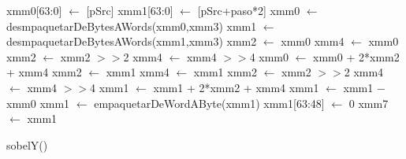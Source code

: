 \documentclass[11pt, a4paper]{article}
\begin{document}
   \begin{algorithm}[H]
     \SetLine
    	xmm0[63:0] $\leftarrow$ [pSrc]\;
			xmm1[63:0] $\leftarrow$ [pSrc+paso*2]\;
			xmm0 $\leftarrow$ desmpaquetarDeBytesAWords(xmm0,xmm3)\;
			xmm1 $\leftarrow$ desmpaquetarDeBytesAWords(xmm1,xmm3)\;
			xmm2 $\leftarrow$ xmm0\;
			xmm4 $\leftarrow$ xmm0\;
			xmm2 $\leftarrow$ xmm2 $>>$2\;
			xmm4 $\leftarrow$ xmm4 $>>$4\;
			xmm0 $\leftarrow$ xmm0 + 2*xmm2 + xmm4\;
			xmm2 $\leftarrow$ xmm1\;
			xmm4 $\leftarrow$ xmm1\;
			xmm2 $\leftarrow$ xmm2 $>>$2\;
			xmm4 $\leftarrow$ xmm4 $>>$4\;
			xmm1 $\leftarrow$ xmm1 + 2*xmm2 + xmm4\;
			xmm1 $\leftarrow$ xmm1 $-$ xmm0\;
			xmm1 $\leftarrow$ empaquetarDeWordAByte(xmm1)\;
			xmm1[63:48] $\leftarrow$ 0\;		
			xmm7 $\leftarrow$ xmm1\;
			
     \caption{sobelY()}
   \end{algorithm}
\end{document}
